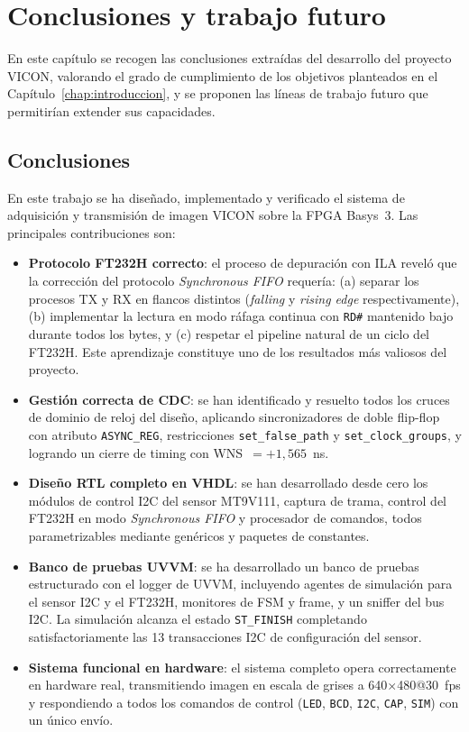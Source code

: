 \documentclass[../main.tex]{subfiles}
\begin{document}
\chapter{Conclusiones y trabajo futuro}
\label{chap:conclusiones}

En este capítulo se recogen las conclusiones extraídas del desarrollo del proyecto \ac{VICON}, valorando el grado de cumplimiento de los objetivos planteados en el Capítulo~\ref{chap:introduccion}, y se proponen las líneas de trabajo futuro que permitirían extender sus capacidades.

\section{Conclusiones}

En este trabajo se ha diseñado, implementado y verificado el sistema de adquisición y transmisión de imagen VICON sobre la FPGA Basys~3. Las principales contribuciones son:

\begin{itemize}
    \item \textbf{Protocolo FT232H correcto}: el proceso de depuración con ILA reveló que la corrección del protocolo \textit{Synchronous FIFO} requería: (a) separar los procesos TX y RX en flancos distintos (\textit{falling} y \textit{rising edge} respectivamente), (b) implementar la lectura en modo ráfaga continua con \texttt{RD\#} mantenido bajo durante todos los bytes, y (c) respetar el pipeline natural de un ciclo del FT232H. Este aprendizaje constituye uno de los resultados más valiosos del proyecto.
    
    \item \textbf{Gestión correcta de CDC}: se han identificado y resuelto todos los cruces de dominio de reloj del diseño, aplicando sincronizadores de doble flip-flop con atributo \texttt{ASYNC\_REG}, restricciones \texttt{set\_false\_path} y \texttt{set\_clock\_groups}, y logrando un cierre de timing con WNS~$= +1{,}565$~ns.
    
    \item \textbf{Diseño RTL completo en VHDL}: se han desarrollado desde cero los módulos de control I2C del sensor MT9V111, captura de trama, control del FT232H en modo \textit{Synchronous FIFO} y procesador de comandos, todos parametrizables mediante genéricos y paquetes de constantes.

    \item \textbf{Banco de pruebas UVVM}: se ha desarrollado un banco de pruebas estructurado con el logger de UVVM, incluyendo agentes de simulación para el sensor I2C y el FT232H, monitores de FSM y frame, y un sniffer del bus I2C. La simulación alcanza el estado \texttt{ST\_FINISH} completando satisfactoriamente las 13 transacciones I2C de configuración del sensor.

    \item \textbf{Sistema funcional en hardware}: el sistema completo opera correctamente en hardware real, transmitiendo imagen en escala de grises a 640$\times$480@30~fps y respondiendo a todos los comandos de control (\texttt{LED}, \texttt{BCD}, \texttt{I2C}, \texttt{CAP}, \texttt{SIM}) con un único envío.
\end{itemize}
\end{document}
